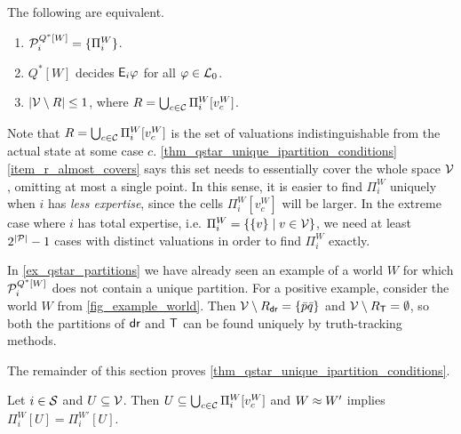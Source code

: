 \begin{theorem}
    \label{thm_qstar_unique_ipartition_conditions}
    The following are equivalent.

    \begin{enumerate}
        \item\label{item_uniquepart} $\mathcal{P}^{Q^*[W]}_i = \{\Pi^W_i\}$.
        \item\label{item_define_all_ephi} $Q^*[W]$ decides $\mathsf{E}_i\varphi$ for all
            $\varphi \in \mathcal{L}_0$.
        \item\label{item_r_almost_covers} $|\mathcal{V} \setminus R| \le 1$, where $R
            = \bigcup_{c \in \mathcal{C}}{\Pi^W_i[v^W_c]}$.
    \end{enumerate}
\end{theorem}

Note that $R = \bigcup_{c \in \mathcal{C}}{\Pi^W_i[v^W_c]}$ is the set of valuations
indistinguishable from the actual state at some case $c$.
\cref{thm_qstar_unique_ipartition_conditions} \cref{item_r_almost_covers} says
this set needs to essentially cover the whole space $\mathcal{V}$, omitting at most a
single point. In this sense, it is easier to find $\Pi^W_i$ uniquely when $i$
has \emph{less expertise}, since the cells $\Pi^W_i[v^W_c]$ will be larger. In
the extreme case where $i$ has total expertise, i.e. $\Pi^W_i = \{\{v\} \mid v
\in \mathcal{V}\}$, we need at least $2^{|\mathcal{P}|} - 1$ cases with distinct
valuations in order to find $\Pi^W_i$ exactly.

\begin{example}
    \label{ex_qstar_unique_ipartition_conditions}
    In \cref{ex_qstar_partitions} we have already seen an example of a world
    $W$ for which $\mathcal{P}^{Q^*[W]}_i$ does not contain a unique partition.
    For a positive example, consider the world $W$ from
    \cref{fig_example_world}. Then $\mathcal{V} \setminus R_{\mathsf{dr}{}} =
    \{\bar{p}\bar{q}\}$ and $\mathcal{V} \setminus R_{\mathsf{T}{}} = \emptyset$, so both
    the partitions of $\mathsf{dr}{}$ and $\mathsf{T}{}$ can be found uniquely by
    truth-tracking methods.
\end{example}

The remainder of this section proves
\cref{thm_qstar_unique_ipartition_conditions}.

\begin{lemma}
    \label{lemma_u_expansion_equal}
    Let $i \in \mathcal{S}$ and $U \subseteq \mathcal{V}$. Then $U \subseteq \bigcup_{c \in
    \mathcal{C}}{\Pi^W_i[v^W_c]}$ and $W \approx W'$ implies $\Pi^W_i[U] =
    \Pi^{W'}_i[U]$.
\end{lemma}

